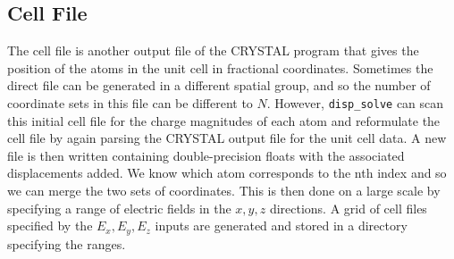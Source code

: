 \subsection{Cell File}
The cell file is another output file of the CRYSTAL program that gives the position of the atoms in the unit cell in fractional coordinates. Sometimes the direct file can be generated in a different spatial group, and so the number of coordinate sets in this file can be different to $N$. However, \texttt{disp\_solve} can scan this initial cell file for the charge magnitudes of each atom and reformulate the cell file by again parsing the CRYSTAL output file for the unit cell data. A new file is then written containing double-precision floats with the associated displacements added. We know which atom corresponds to the nth index and so we can merge the two sets of coordinates. This is then done on a large scale by specifying a range of electric fields in the $x,y,z$ directions. A grid of cell files specified by the $E_x,E_y,E_z$ inputs are generated and stored in a directory specifying the ranges. 




